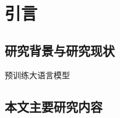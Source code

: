 \chapter{引言}\label{ch1}

\section{研究背景与研究现状}

预训练大语言模型\cite{Transformer,bert,GPT1,GPT2,GPT3}

\section{本文主要研究内容}
